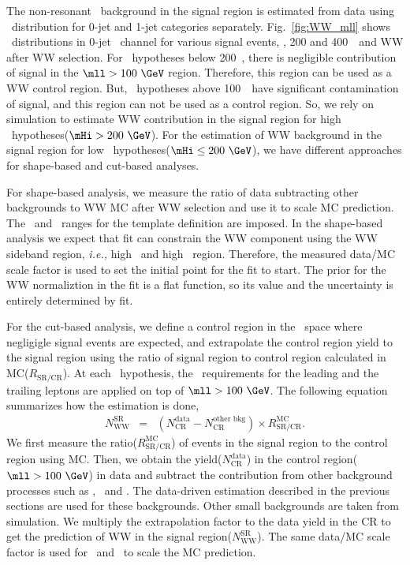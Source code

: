 The non-resonant \WW\ background in the signal region is estimated from data using \mll\ distribution
for 0-jet and 1-jet categories separately. 
Fig.~\ref{fig:WW_mll} shows \mll\ distributions in 0-jet \DF\ channel for various signal events,
, 200 and 400~\GeV\ and WW after WW selection. For \mHi\ hypotheses below 200~\GeV, 
there is negligible contribution of signal in the $\mll>100~\GeV$ region. 
Therefore, this region can be used as a WW control region.  
But, \mHi\ hypotheses above 100~\GeV\ have significant contamination of signal, 
and this region can not be used as a control region. So, we rely on simulation
to estimate WW contribution in the signal region for high \mHi\ hypotheses($\mHi>200~\GeV$). 
For the estimation of WW background in the signal region for low \mHi\ hypotheses($\mHi\le200~\GeV$), 
we have different approaches for shape-based and cut-based analyses. 

For shape-based analysis, we measure the ratio of data subtracting other backgrounds to WW MC  
after WW selection and use it to scale MC prediction. 
The \mll\ and \mT\ ranges for the template definition are imposed.  
In the shape-based analysis we expect that fit can constrain the WW component using 
the WW sideband region, \textit{i.e.,} high \mT\ and high \mll\ region. Therefore,   
the measured data/MC scale factor is used to set the initial point for the fit to start. 
The prior for the WW normaliztion in the fit is a flat function, 
so its value and the uncertainty is entirely determined by fit. 

For the cut-based analysis, we define a control region in the \mll\ space where 
negligigle signal events are expected, and extrapolate the control region yield 
to the signal region using the ratio of signal region to control region calculated 
in MC($R_{\textrm{SR/CR}}$). 
At each \mHi\ hypothesis, the \pt\ requirements for the leading and the trailing leptons 
are applied on top of $\mll>100~\GeV$. The following equation summarizes 
how the estimation is done, 
\begin{eqnarray} 
N_{\textrm{WW}}^{\textrm{SR}} 
&=&  
\left( N_{\textrm{CR}}^{\textrm{data}}  
     - N_{\textrm{CR}}^{\textrm{other bkg}}\right) \times R_\textrm{SR/CR}^{\textrm{MC}}.  
\end{eqnarray} 
We first measure the ratio($R_\textrm{SR/CR}^{\textrm{MC}}$) of events in the signal region 
to the control region using MC.  
Then, we obtain the yield($N_{\textrm{CR}}^{\textrm{data}}$) in the 
control region($\mll>100~\GeV$) in data and subtract the contribution from other 
background processes such as \topbkg, \Wjets\ and \dyll.  
The data-driven estimation described in the previous sections are used for 
these backgrounds. Other small backgrounds are taken from simulation. 
We multiply the extrapolation factor to the data yield in the CR 
to get the prediction of WW in the signal region($N_{\textrm{WW}}^{\textrm{SR}}$).
The same data/MC scale factor is used for \qqww\ and \ggww\ to scale 
the MC prediction. 

